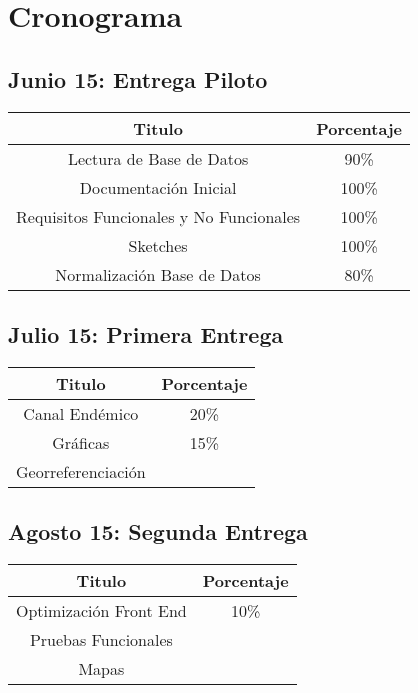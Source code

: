 \section{Cronograma}

\subsection{Junio 15: Entrega Piloto}

\begin{center}
\begin{tabular}{|c|c|}
\hline 
Titulo & Porcentaje \\ \hline
\hline
Lectura de Base de Datos & 90\% \\ \hline
Documentación Inicial & 100\% \\ \hline
Requisitos Funcionales y No Funcionales & 100\%\\ \hline
Sketches & 100\%\\ \hline
Normalización Base de Datos & 80\%\\ \hline

\end{tabular}
\end{center}

\subsection{Julio 15: Primera Entrega}

\begin{center}
\begin{tabular}{|c|c|}
\hline 
Titulo & Porcentaje \\ \hline
\hline
Canal Endémico & 20\% \\ \hline
Gráficas & 15\% \\ \hline
Georreferenciación & \\ \hline
\end{tabular}
\end{center}


\subsection{Agosto 15: Segunda Entrega }


\begin{center}
\begin{tabular}{|c|c|}
\hline 
Titulo & Porcentaje \\ \hline
\hline
Optimización Front End &  10\% \\ \hline
Pruebas Funcionales & \\ \hline
Mapas & \\ \hline
\end{tabular}
\end{center}

